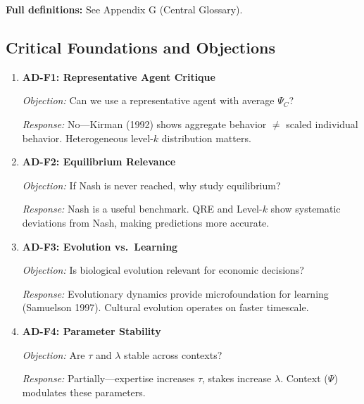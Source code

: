 \textbf{Full definitions:} See Appendix G (Central Glossary).

\subsection{Critical Foundations and Objections}
\label{sec:ad-foundations}


\begin{enumerate}
    \item \textbf{AD-F1: Representative Agent Critique}

    \textit{Objection:} Can we use a representative agent with average $\Psi_C$?

    \textit{Response:} No---Kirman (1992) shows aggregate behavior $\neq$ scaled
    individual behavior. Heterogeneous level-$k$ distribution matters.

    \item \textbf{AD-F2: Equilibrium Relevance}

    \textit{Objection:} If Nash is never reached, why study equilibrium?

    \textit{Response:} Nash is a useful benchmark. QRE and Level-$k$ show
    systematic deviations from Nash, making predictions more accurate.

    \item \textbf{AD-F3: Evolution vs.\ Learning}

    \textit{Objection:} Is biological evolution relevant for economic decisions?

    \textit{Response:} Evolutionary dynamics provide microfoundation for learning
    (Samuelson 1997). Cultural evolution operates on faster timescale.

    \item \textbf{AD-F4: Parameter Stability}

    \textit{Objection:} Are $\tau$ and $\lambda$ stable across contexts?

    \textit{Response:} Partially---expertise increases $\tau$, stakes increase
    $\lambda$. Context ($\Psi$) modulates these parameters.
\end{enumerate}

